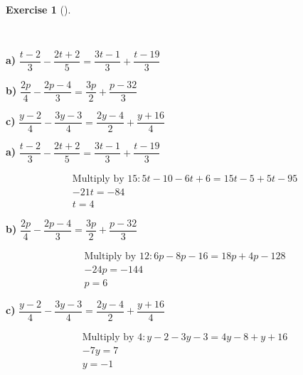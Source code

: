 \documentclass[
  letterpaper,
  DIV=11,
  numbers=noendperiod]{scrreprt}
\theoremstyle{definition}
\newtheorem{exercise}{Exercise}[chapter]
\theoremstyle{remark}
\begin{document}
\begin{exercise}[]\protect\hypertarget{exr-u5-16}{}\label{exr-u5-16}

~

\textbf{a)}
\(\displaystyle \dfrac{t - 2}{3} - \dfrac{2t + 2}{5} = \dfrac{3t - 1}{3} + \dfrac{t - 19}{3}\)

\textbf{b)}
\(\displaystyle \dfrac{2p}{4} - \dfrac{2p - 4}{3} = \dfrac{3p}{2} + \dfrac{p - 32}{3}\)

\textbf{c)}
\(\displaystyle \dfrac{y - 2}{4} - \dfrac{3y - 3}{4} = \dfrac{2y - 4}{2} + \dfrac{y + 16}{4}\)

\begin{tcolorbox}[enhanced jigsaw, opacitybacktitle=0.6, coltitle=black, arc=.35mm, colframe=quarto-callout-tip-color-frame, colback=white, bottomrule=.15mm, left=2mm, colbacktitle=quarto-callout-tip-color!10!white, titlerule=0mm, opacityback=0, title=\textcolor{quarto-callout-tip-color}{\faLightbulb}\hspace{0.5em}{🔍 View Solutions}, leftrule=.75mm, breakable, rightrule=.15mm, bottomtitle=1mm, toptitle=1mm, toprule=.15mm]

\textbf{a)}
\(\displaystyle \dfrac{t - 2}{3} - \dfrac{2t + 2}{5} = \dfrac{3t - 1}{3} + \dfrac{t - 19}{3}\)

\begin{align*}
\text{Multiply by }15: 5t - 10 - 6t + 6 = 15t - 5 + 5t - 95 \\ -21t = -84 \\ t = 4
\end{align*}

\textbf{b)}
\(\displaystyle \dfrac{2p}{4} - \dfrac{2p - 4}{3} = \dfrac{3p}{2} + \dfrac{p - 32}{3}\)

\begin{align*}
\text{Multiply by }12: 6p - 8p - 16 = 18p + 4p - 128 \\ -24p = -144 \\ p = 6
\end{align*}

\textbf{c)}
\(\displaystyle \dfrac{y - 2}{4} - \dfrac{3y - 3}{4} = \dfrac{2y - 4}{2} + \dfrac{y + 16}{4}\)

\begin{align*}
\text{Multiply by }4: y - 2 - 3y - 3 = 4y - 8 + y + 16 \\ -7y = 7 \\ y = -1
\end{align*}

\end{tcolorbox}

\end{exercise}
\end{document}
